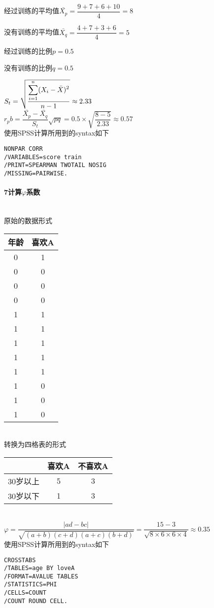\documentclass[UTF8]{ctexart}
\begin{document}
经过训练的平均值$\bar{X_p}=\dfrac{9+7+6+10}{4}=8$

没有训练的平均值$\bar{X_q}=\dfrac{4+7+3+6}{4}=5$

经过训练的比例$p=0.5$

没有训练的比例$q=0.5$

$S_t=\sqrt{\dfrac{\displaystyle \sum_{i=1}^n (X_i-\Bar{X})^2}{n-1}}\approx2.33$
~\\

$r_pb=\dfrac{\bar{X_p}-\bar{X_q}}{S_t}\sqrt{pq}=0.5\times\sqrt{\dfrac{8-5}{2.33}}\approx0.57$
~\\

\noindent
使用SPSS计算所用到的syntax如下
\begin{verbatim}
NONPAR CORR 
/VARIABLES=score train 
/PRINT=SPEARMAN TWOTAIL NOSIG 
/MISSING=PAIRWISE.
\end{verbatim}


\paragraph{7计算$\varphi$系数}
~\\

原始的数据形式

\begin{tabular}{cc}
\toprule
年龄 & 喜欢A \\
\midrule
0 & 1 \\
0 & 0 \\
0 & 0 \\
0 & 0 \\
1 & 1 \\
1 & 1 \\
1 & 1 \\
1 & 1 \\
1 & 1 \\
1 & 0 \\
1 & 0 \\
1 & 0 \\

\bottomrule
\end{tabular}

~\\

转换为四格表的形式

\begin{tabular}{ccc}
\toprule
 & 喜欢A & 不喜欢A \\
\midrule
30岁以上 & 5 & 3 \\
30岁以下 & 1 & 3 \\

\bottomrule
\end{tabular}

~\\

$\varphi=\dfrac{|ad-bc|}{\sqrt{(a+b)(c+d)(a+c)(b+d)}}=\dfrac{15-3}{\sqrt{8\times6\times6\times4}}\approx0.35$
~\\

\noindent
使用SPSS计算所用到的syntax如下
\begin{verbatim}
CROSSTABS 
/TABLES=age BY loveA 
/FORMAT=AVALUE TABLES 
/STATISTICS=PHI 
/CELLS=COUNT 
/COUNT ROUND CELL.
\end{verbatim}
\end{document}
